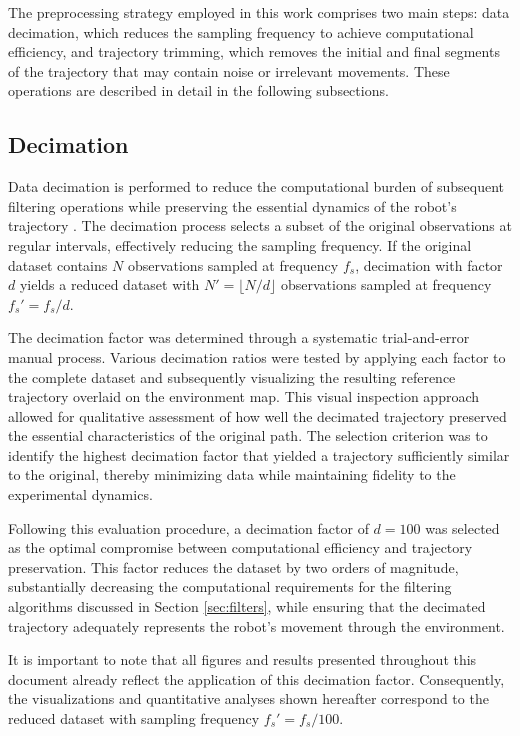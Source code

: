 \documentclass[conference]{IEEEtran}
\begin{document}
The preprocessing strategy employed in this work comprises two main steps: data decimation, which reduces the sampling frequency to achieve computational efficiency, and trajectory trimming, which removes the initial and final segments of the trajectory that may contain noise or irrelevant movements. These operations are described in detail in the following subsections.

\subsection{Decimation} \label{sec:decimation}

Data decimation is performed to reduce the computational burden of subsequent filtering operations while preserving the essential dynamics of the robot's trajectory \cite{Aguirre2007}. The decimation process selects a subset of the original observations at regular intervals, effectively reducing the sampling frequency. If the original dataset contains $N$ observations sampled at frequency $f_s$, decimation with factor $d$ yields a reduced dataset with $N' = \lfloor N / d \rfloor$ observations sampled at frequency $f_s' = f_s / d$.

The decimation factor was determined through a systematic trial-and-error manual process. Various decimation ratios were tested by applying each factor to the complete dataset and subsequently visualizing the resulting reference trajectory overlaid on the environment map. This visual inspection approach allowed for qualitative assessment of how well the decimated trajectory preserved the essential characteristics of the original path. The selection criterion was to identify the highest decimation factor that yielded a trajectory sufficiently similar to the original, thereby minimizing data while maintaining fidelity to the experimental dynamics.

Following this evaluation procedure, a decimation factor of $d = 100$ was selected as the optimal compromise between computational efficiency and trajectory preservation. This factor reduces the dataset by two orders of magnitude, substantially decreasing the computational requirements for the filtering algorithms discussed in Section \ref{sec:filters}, while ensuring that the decimated trajectory adequately represents the robot's movement through the environment.

It is important to note that all figures and results presented throughout this document already reflect the application of this decimation factor. Consequently, the visualizations and quantitative analyses shown hereafter correspond to the reduced dataset with sampling frequency $f_s' = f_s / 100$.
\end{document}
